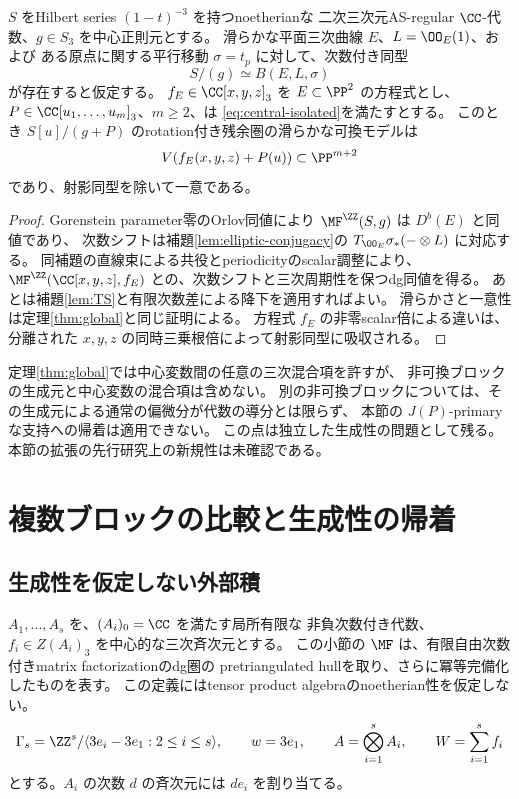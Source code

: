 \begin{corollary}[平行移動を伴う一般の楕円ブロック]\label{cor:elliptic-central-cubic}
 \(S\) をHilbert series \((1-t)^{-3}\) を持つnoetherianな
 二次三次元AS-regular \(\CC\)-代数、\(g\in S_3\) を中心正則元とする。
 滑らかな平面三次曲線 \(E\)、\(L=\OO_E(1)\)、および
 ある原点に関する平行移動 \(\sigma=t_p\) に対して、次数付き同型
 \[
 S/(g)\simeq B(E,L,\sigma)
 \]
 が存在すると仮定する。
 \(f_E\in\CC[x,y,z]_3\) を \(E\subset\PP^2\) の方程式とし、
 \(P\in\CC[u_1,\ldots,u_m]_3\)、\(m\ge2\)、は
 \eqref{eq:central-isolated}を満たすとする。
 このとき \(S[u]/(g+P)\) のrotation付き残余圏の滑らかな可換モデルは
 \[
 V(f_E(x,y,z)+P(u))\subset\PP^{m+2}
 \]
 であり、射影同型を除いて一意である。
\end{corollary}
\begin{proof}
 Gorenstein parameter零のOrlov同値により
 \(\MF^\ZZ(S,g)\) は \(D^b(E)\) と同値であり、
 次数シフトは補題\ref{lem:elliptic-conjugacy}の
 \(T_{\OO_E}\sigma_*(-\otimes L)\) に対応する。
 同補題の直線束による共役とperiodicityのscalar調整により、
 \(\MF^\ZZ(\CC[x,y,z],f_E)\) との、次数シフトと三次周期性を保つdg同値を得る。
 あとは補題\ref{lem:TS}と有限次数差による降下を適用すればよい。
 滑らかさと一意性は定理\ref{thm:global}と同じ証明による。
 方程式 \(f_E\) の非零scalar倍による違いは、
 分離された \(x,y,z\) の同時三乗根倍によって射影同型に吸収される。
\end{proof}

\begin{remark}[この拡張の範囲]
 定理\ref{thm:global}では中心変数間の任意の三次混合項を許すが、
 非可換ブロックの生成元と中心変数の混合項は含めない。
 別の非可換ブロックについては、その生成元による通常の偏微分が代数の導分とは限らず、
 本節の \(J(P)\)-primaryな支持への帰着は適用できない。
 この点は独立した生成性の問題として残る。
 本節の拡張の先行研究上の新規性は未確認である。
\end{remark}

\section{複数ブロックの比較と生成性の帰着}\label{sec:multiblock}

\subsection{生成性を仮定しない外部積}

\(A_1,\ldots,A_s\) を、\((A_i)_0=\CC\) を満たす局所有限な
非負次数付き代数、\(f_i\in Z(A_i)_3\) を中心的な三次斉次元とする。
この小節の \(\MF\) は、有限自由次数付きmatrix factorizationのdg圏の
pretriangulated hullを取り、さらに冪等完備化したものを表す。
この定義にはtensor product algebraのnoetherian性を仮定しない。
\[
 \Gamma_s=\ZZ^s/\langle3e_i-3e_1:2\le i\le s\rangle,
 \qquad w=3e_1,
 \qquad A=\bigotimes_{i=1}^s A_i,
 \qquad W=\sum_{i=1}^s f_i
\]
とする。\(A_i\) の次数 \(d\) の斉次元には \(de_i\) を割り当てる。

